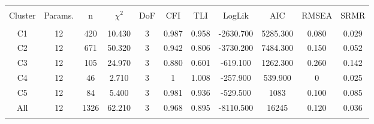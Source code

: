 
\begin{table}[!htbp] \centering 
  \caption{} 
  \label{struc_model_fit_clust_stats} 
\begin{tabular}{@{\extracolsep{0pt}} ccccccccccc} 
\\[-1.8ex]\hline 
\hline \\[-1.8ex] 
{Cluster} & {Params.} & {n} & {$\chi^{2}$} & {DoF} & {CFI} & {TLI} & {LogLik} & {AIC} & {RMSEA} & {SRMR} \\
\hline \\[-1.8ex] 
C1 & 12 & 420 & 10.430 & 3 & 0.987 & 0.958 & -2630.700 & 5285.300 & 0.080 & 0.029 \\ 
C2 & 12 & 671 & 50.320 & 3 & 0.942 & 0.806 & -3730.200 & 7484.300 & 0.150 & 0.052 \\ 
C3 & 12 & 105 & 24.970 & 3 & 0.880 & 0.601 & -619.100 & 1262.300 & 0.260 & 0.142 \\ 
C4 & 12 & 46 & 2.710 & 3 & 1 & 1.008 & -257.900 & 539.900 & 0 & 0.025 \\ 
C5 & 12 & 84 & 5.400 & 3 & 0.981 & 0.936 & -529.500 & 1083 & 0.100 & 0.085 \\ 
All & 12 & 1326 & 62.210 & 3 & 0.968 & 0.895 & -8110.500 & 16245 & 0.120 & 0.036 \\ 
\hline \\[-1.8ex] 
\end{tabular} 
\end{table} 
